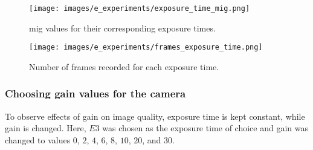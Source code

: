         \begin{figure}[ht]
            \centering
            \texttt{[image: images/e\_experiments/exposure\_time\_mig.png]}
            \caption{\gls{mig} values for their corresponding exposure times.}
            \label{fig:exposure_time_mig.png}
        \end{figure}

        \begin{figure}[ht]
            \centering
            \texttt{[image: images/e\_experiments/frames\_exposure\_time.png]}
            \caption{Number of frames recorded for each exposure time.}
            \label{fig:frames_exposure_time.png}
        \end{figure}
        


    \subsubsection*{Choosing gain values for the camera}
        To observe effects of gain on image quality, exposure time is kept constant, while gain is changed. Here, $E3$ was chosen as the exposure time of choice and gain was changed to values $0$, $2$, $4$, $6$, $8$, $10$, $20$, and $30$.

